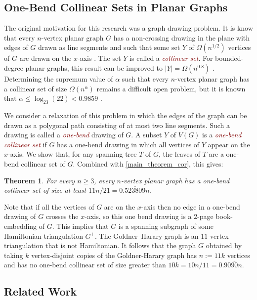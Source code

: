 \documentclass[a4paper,UKenglish,cleveref, autoref, thm-restate]{lipics-v2021}
\newtheorem{thm}{Theorem}
\newcommand{\defin}[1]{\emph{\textcolor{Maroon}{#1}}}
\begin{document}
\subsection{One-Bend Collinear Sets in Planar Graphs}


The original motivation for this research was a graph drawing problem.  It is know that every $n$-vertex planar graph $G$ has a non-crossing drawing in the plane with edges of $G$ drawn as line segments and such that some set $Y$ of $\Omega(n^{1/2})$ vertices of $G$ are drawn on the $x$-axis \cite{bose.dujmovic:polynomial,dujmovic:utility}.  The set $Y$ is called a \defin{collinear set}.  For bounded-degree planar graphs, this result can be improved to $|Y|=\Omega(n^{0.8})$ \cite{dujmovic.morin:dual}.  Determining the supremum value of $\alpha$ such that every $n$-vertex planar graph has a collinear set of size $\Omega(n^{\alpha})$ remains a difficult open problem, but it is known that $\alpha \le \log_{23}(22) < 0.9859$ \cite{ravsky.verbitsky:collinear}.

We consider a relaxation of this problem in which the edges of the graph can be drawn as a polygonal path consisting of at most two line segments.  Such a drawing is called a \defin{one-bend} drawing of $G$.  A subset $Y$ of $V(G)$ is a \defin{one-bend collinear set} if $G$ has a one-bend drawing in which all vertices of $Y$ appear on the $x$-axis.  We show that, for any spanning tree $T$ of $G$, the leaves of $T$ are a one-bend collinear set of $G$.  Combined with \cref{main_theorem_cor}, this gives:

\begin{thm}\label{one_bend_collinear_thm}
  For every $n\ge 3$, every $n$-vertex planar graph has a one-bend collinear set of size at least $11n/21=0.\overline{523809}n$.
\end{thm}

Note that if all the vertices of $G$ are on the $x$-axis then no edge in a one-bend drawing of $G$ crosses the $x$-axis, so this one bend drawing is a $2$-page book-embedding of $G$. This implies that $G$ is a spanning subgraph of some Hamiltonian triangulation $G^+$.  The Goldner–Harary graph is an $11$-vertex triangulation that is not Hamiltonian. It follows that the graph $G$ obtained by taking $k$ vertex-disjoint copies of the Goldner-Harary graph has $n:=11k$ vertices and has no one-bend collinear set of size greater than $10k=10n/11=0.90\overline{90}n$.

\subsection{Related Work}
\end{document}
